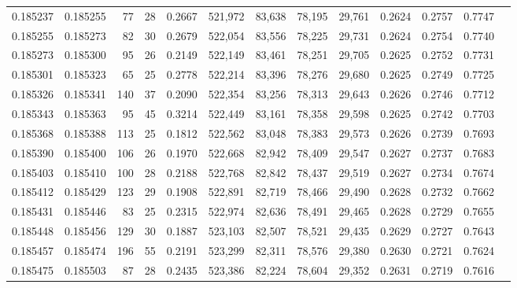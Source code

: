 \begin{tabular}{rrrrrrrrrrrrr}
0.185237 & 0.185255 &    77 &  28 &                                     0.2667 & 521,972 &  83,638 &  78,195 &  29,761 & 0.2624 & 0.2757 & 0.7747 \\
0.185255 & 0.185273 &    82 &  30 &                                     0.2679 & 522,054 &  83,556 &  78,225 &  29,731 & 0.2624 & 0.2754 & 0.7740 \\
0.185273 & 0.185300 &    95 &  26 &                                     0.2149 & 522,149 &  83,461 &  78,251 &  29,705 & 0.2625 & 0.2752 & 0.7731 \\
0.185301 & 0.185323 &    65 &  25 &                                     0.2778 & 522,214 &  83,396 &  78,276 &  29,680 & 0.2625 & 0.2749 & 0.7725 \\
0.185326 & 0.185341 &   140 &  37 &                                     0.2090 & 522,354 &  83,256 &  78,313 &  29,643 & 0.2626 & 0.2746 & 0.7712 \\
0.185343 & 0.185363 &    95 &  45 &                                     0.3214 & 522,449 &  83,161 &  78,358 &  29,598 & 0.2625 & 0.2742 & 0.7703 \\
0.185368 & 0.185388 &   113 &  25 &                                     0.1812 & 522,562 &  83,048 &  78,383 &  29,573 & 0.2626 & 0.2739 & 0.7693 \\
0.185390 & 0.185400 &   106 &  26 &                                     0.1970 & 522,668 &  82,942 &  78,409 &  29,547 & 0.2627 & 0.2737 & 0.7683 \\
0.185403 & 0.185410 &   100 &  28 &                                     0.2188 & 522,768 &  82,842 &  78,437 &  29,519 & 0.2627 & 0.2734 & 0.7674 \\
0.185412 & 0.185429 &   123 &  29 &                                     0.1908 & 522,891 &  82,719 &  78,466 &  29,490 & 0.2628 & 0.2732 & 0.7662 \\
0.185431 & 0.185446 &    83 &  25 &                                     0.2315 & 522,974 &  82,636 &  78,491 &  29,465 & 0.2628 & 0.2729 & 0.7655 \\
0.185448 & 0.185456 &   129 &  30 &                                     0.1887 & 523,103 &  82,507 &  78,521 &  29,435 & 0.2629 & 0.2727 & 0.7643 \\
0.185457 & 0.185474 &   196 &  55 &                                     0.2191 & 523,299 &  82,311 &  78,576 &  29,380 & 0.2630 & 0.2721 & 0.7624 \\
0.185475 & 0.185503 &    87 &  28 &                                     0.2435 & 523,386 &  82,224 &  78,604 &  29,352 & 0.2631 & 0.2719 & 0.7616 \\

\end{tabular}
